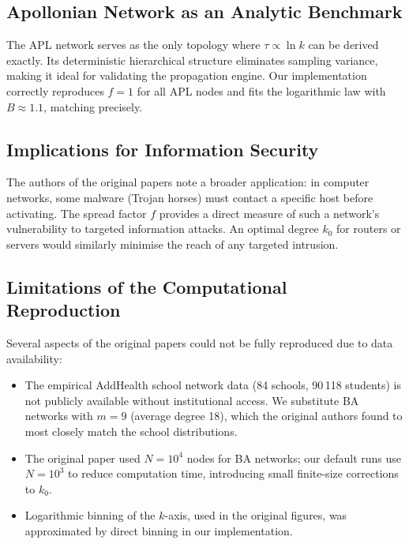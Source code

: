 \documentclass[9pt,a4paper,twocolumn,twoside]{tau-class/tau}
\begin{document}
\subsection{Apollonian Network as an Analytic Benchmark}

The APL network serves as the only topology where $\tau \propto \ln k$ can be derived exactly. Its deterministic hierarchical structure eliminates sampling variance, making it ideal for validating the propagation engine. Our implementation correctly reproduces $f = 1$ for all APL nodes and fits the logarithmic law with $B \approx 1.1$, matching \cite{lind2007pre} precisely.

\subsection{Implications for Information Security}

The authors of the original papers note a broader application: in computer networks, some malware (Trojan horses) must contact a specific host before activating. The spread factor $f$ provides a direct measure of such a network's vulnerability to targeted information attacks. An optimal degree $k_0$ for routers or servers would similarly minimise the reach of any targeted intrusion.

\subsection{Limitations of the Computational Reproduction}

Several aspects of the original papers could not be fully reproduced due to data availability:
\begin{itemize}
    \item The empirical AddHealth school network data (84 schools, 90\,118 students) is not publicly available without institutional access. We substitute BA networks with $m = 9$ (average degree 18), which the original authors found to most closely match the school distributions.
    \item The original paper used $N = 10^4$ nodes for BA networks; our default runs use $N = 10^3$ to reduce computation time, introducing small finite-size corrections to $k_0$.
    \item Logarithmic binning of the $k$-axis, used in the original figures, was approximated by direct binning in our implementation.
\end{itemize}

\end{document}

